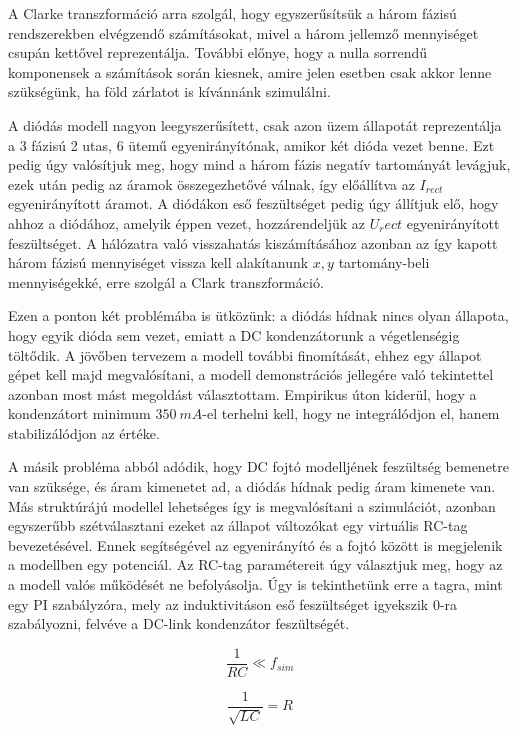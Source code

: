 A Clarke transzformáció arra szolgál, hogy egyszerűsítsük a három fázisú rendszerekben elvégzendő számításokat, mivel a három jellemző mennyiséget csupán kettővel reprezentálja. További előnye, hogy a nulla sorrendű komponensek a számítások során kiesnek, amire jelen esetben csak akkor lenne szükségünk, ha föld zárlatot is kívánnánk szimulálni.

A diódás modell nagyon leegyszerűsített, csak azon üzem állapotát reprezentálja a 3 fázisú 2 utas, 6 ütemű egyenirányítónak, amikor két dióda vezet benne. Ezt pedig úgy valósítjuk meg, hogy mind a három fázis negatív tartományát levágjuk, ezek után pedig az áramok összegezhetővé válnak, így előállítva az $I_{rect}$ egyenirányított áramot. A diódákon eső feszültséget pedig úgy állítjuk elő, hogy ahhoz a diódához, amelyik éppen vezet, hozzárendeljük az $U_rect$ egyenirányított feszültséget. A hálózatra való visszahatás kiszámításához azonban az így kapott három fázisú mennyiséget vissza kell alakítanunk $x,y$ tartomány-beli mennyiségekké, erre szolgál a Clark transzformáció.

Ezen a ponton két problémába is ütközünk: a diódás hídnak nincs olyan állapota, hogy egyik dióda sem vezet, emiatt a DC kondenzátorunk a végetlenségig töltődik. A jövőben tervezem a modell további finomítását, ehhez egy állapot gépet kell majd megvalósítani, a modell demonstrációs jellegére való tekintettel azonban most mást megoldást választottam. Empirikus úton kiderül, hogy a kondenzátort minimum $350\ mA$-el terhelni kell, hogy ne integrálódjon el, hanem stabilizálódjon az értéke.

A másik probléma abból adódik, hogy DC fojtó modelljének feszültség bemenetre van szüksége, és áram kimenetet ad, a diódás hídnak pedig áram kimenete van. Más struktúrájú modellel lehetséges így is megvalósítani a szimulációt, azonban egyszerűbb szétválasztani ezeket az állapot változókat egy virtuális RC-tag bevezetésével. Ennek segítségével az egyenirányító és a fojtó között is megjelenik a modellben egy potenciál. Az RC-tag paramétereit úgy választjuk meg, hogy az a modell valós működését ne befolyásolja. Úgy is tekinthetünk erre a tagra, mint egy PI szabályzóra, mely az induktivitáson eső feszültséget igyekszik $0$-ra szabályozni, felvéve a DC-link kondenzátor feszültségét.

\begin{equation}
\frac{1}{RC} \ll f_{sim}
\end{equation}

\begin{equation}
\frac{1}{\sqrt{LC}} = R
\end{equation}

